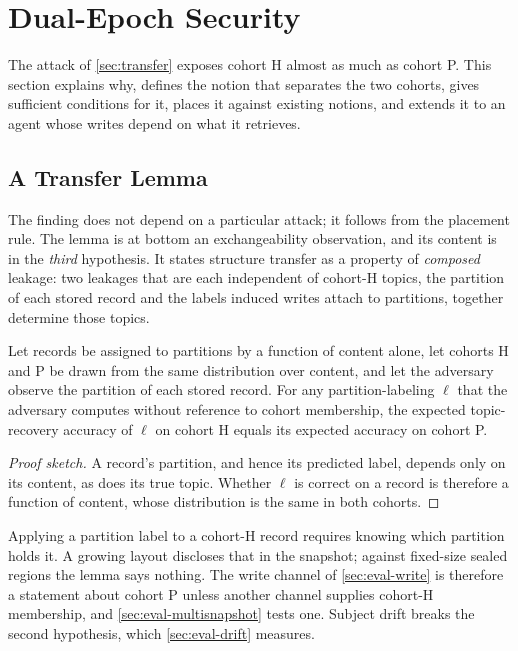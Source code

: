 \section{Dual-Epoch Security}
\label{sec:dualepoch}

The attack of \cref{sec:transfer} exposes cohort H almost as much as cohort P. This section
explains why, defines the notion that separates the two cohorts, gives sufficient conditions for
it, places it against existing notions, and extends it to an agent whose writes depend on what it
retrieves.

\subsection{A Transfer Lemma}
\label{sec:transfer-lemma}

The finding does not depend on a particular attack; it follows from the placement rule. The lemma
is at bottom an exchangeability observation, and its content is in the \emph{third} hypothesis. It
states structure transfer as a property of \emph{composed} leakage: two leakages that are each
independent of cohort-H topics, the partition of each stored record and the labels induced writes
attach to partitions, together determine those topics.

\begin{lemma}[Transfer]
\label{lem:transfer}
Let records be assigned to partitions by a function of content alone, let cohorts H and P be
drawn from the same distribution over content, and let the adversary observe the partition of
each stored record. For any partition-labeling $\ell$ that the adversary computes without
reference to cohort membership, the expected topic-recovery accuracy of $\ell$ on cohort H equals
its expected accuracy on cohort P.
\end{lemma}

\begin{proof}[Proof sketch]
A record's partition, and hence its predicted label, depends only on its content, as does its true
topic. Whether $\ell$ is correct on a record is therefore a function of content, whose distribution
is the same in both cohorts.
\end{proof}

Applying a partition label to a cohort-H record requires knowing which partition holds it. A
growing layout discloses that in the snapshot; against fixed-size sealed regions the lemma says
nothing. The write channel of \cref{sec:eval-write} is therefore a statement about cohort P unless
another channel supplies cohort-H membership, and \cref{sec:eval-multisnapshot} tests one. Subject
drift breaks the second hypothesis, which \cref{sec:eval-drift} measures.


